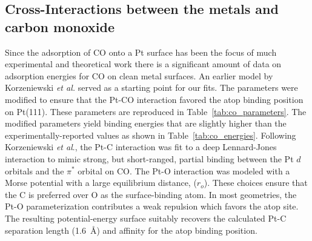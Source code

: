 \documentclass[journal = jpccck, manuscript = article]{achemso}
\begin{document}
\subsection{Cross-Interactions between the metals and carbon monoxide}

Since the adsorption of CO onto a Pt surface has been the focus
of much experimental \cite{Yeo, Hopster:1978, Ertl:1977, Kelemen:1979}
and theoretical work
\cite{Beurden:2002ys,Pons:1986,Deshlahra:2009,Feibelman:2001,Mason:2004}
there is a significant amount of data on adsorption energies for CO on
clean metal surfaces. An earlier model by Korzeniewski {\it et
  al.}\cite{Pons:1986} served as a starting point for our fits. The parameters were
modified to ensure that the Pt-CO interaction favored the atop binding
position on Pt(111). These parameters are reproduced in Table~\ref{tab:co_parameters}.
The modified parameters yield binding energies that are slightly higher
than the experimentally-reported values as shown in Table~\ref{tab:co_energies}. Following Korzeniewski
{\it et al}.,\cite{Pons:1986} the Pt-C interaction was fit to a deep
Lennard-Jones interaction to mimic strong, but short-ranged, partial
binding between the Pt $d$ orbitals and the $\pi^*$ orbital on CO. The
Pt-O interaction was modeled with a Morse potential with a large
equilibrium distance, ($r_o$).  These choices ensure that the C is preferred
over O as the surface-binding atom. In most geometries, the Pt-O parameterization contributes a weak
repulsion which favors the atop site.  The resulting potential-energy
surface suitably recovers the calculated Pt-C separation length
(1.6~\AA)\cite{Beurden:2002ys} and affinity for the atop binding
position.\cite{Deshlahra:2012, Hopster:1978}
\end{document}

